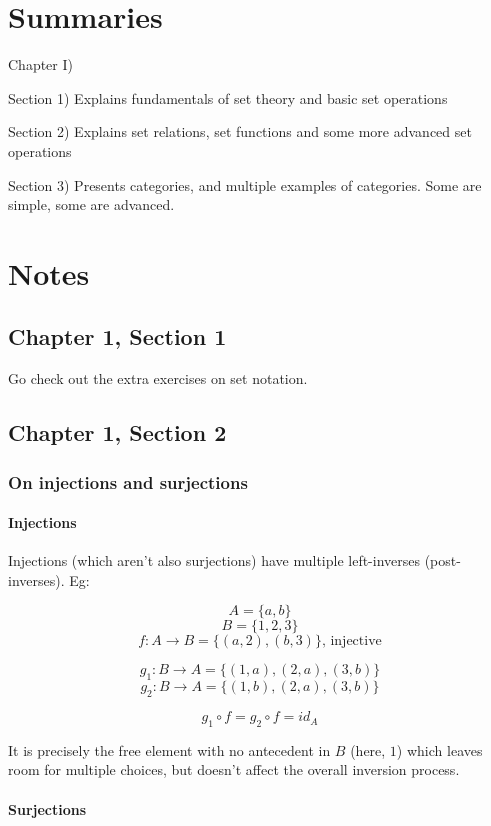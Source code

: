 \documentclass[12pt, letterpaper, twoside]{report}
\begin{document}
\author{Multiversity \textit{Algebra Chapter 0} Reading Group}
\part{Summaries}

Chapter I)

Section 1) Explains fundamentals of set theory and basic set operations

Section 2) Explains set relations, set functions and some more advanced set operations

Section 3) Presents categories, and multiple examples of categories. Some are simple, some are advanced.

\newpage
\part{Notes}
\chapter*{Chapter 1, Section 1}

Go check out the extra exercises on set notation.
\chapter*{Chapter 1, Section 2}

\section*{On injections and surjections}

\subsection*{Injections}

Injections (which aren't also surjections) have multiple left-inverses (post-inverses). Eg:

$$A = \{ a, b    \}$$
$$B = \{ 1, 2, 3 \}$$
$$f : A \to B = \{ (a, 2), (b, 3) \} \text{, injective}$$

$$g_1 : B \to A = \{ (1, a), (2, a), (3, b) \}$$
$$g_2 : B \to A = \{ (1, b), (2, a), (3, b) \}$$

$$g_1 \circ f = g_2 \circ f = id_A$$

It is precisely the free element with no antecedent in $B$ (here, $1$) which leaves room for multiple choices, but doesn't affect the overall inversion process.


\subsection*{Surjections}
\end{document}
